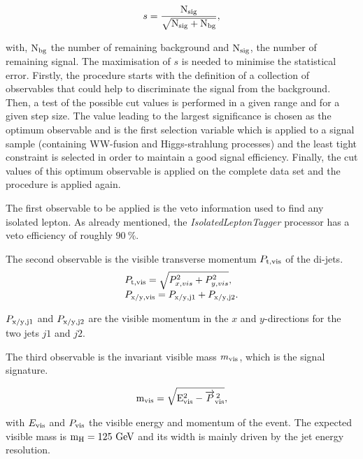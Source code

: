   \begin{equation}
    s = \frac{\rm{N_{sig}}}{\sqrt{\rm{N_{sig}}+ \rm{N_{bg}}}},
  \end{equation}

  with, $\rm{N_{bg}}$ the number of remaining background and $\rm{N_{sig}}$, the number of remaining signal.
  The maximisation of $s$ is needed to minimise the statistical error.
  Firstly, the procedure starts with the definition of a collection of observables that could help to discriminate the signal from the background.
  Then, a test of the possible cut values is performed in a given range and for a given step size.
  The value leading to the largest significance is chosen as the optimum observable and is the first selection variable which is applied to a signal sample (containing WW-fusion and Higgs-strahlung processes) and the least tight constraint is selected in order to maintain a good signal efficiency.
  Finally, the cut values of this optimum observable is applied on the complete data set and the procedure is applied again.

  The first observable to be applied is the veto information used to find any isolated lepton.
  As already mentioned, the \textit{IsolatedLeptonTagger} processor has a veto efficiency of roughly $90~\%$. 

  The second observable is the visible transverse momentum $P_{\rm{t,vis}}$ of the di-jets. 
  \begin{equation}
    \begin{array}{lcl}
      P_{\rm{t,vis}} = \sqrt{P^2_{x,vis} + P^2_{y,vis}}, \\
      P_{\rm{x/y,vis}} = P_{\rm{x/y,j1}} + P_{\rm{x/y,j2}}. 
    \end{array}
  \end{equation}
 
  $ P_{\rm{x/y,j1}}$ and $ P_{\rm{x/y,j2}}$ are the visible momentum in the $x$ and $y$-directions for the two jets $j1$ and $j2$.

  The third observable is the invariant visible mass $m_{\rm{vis}}$, which is the signal signature.

  \begin{equation}
   \rm{m_{vis}} = \sqrt{E^2_{\rm{vis}} - \overrightarrow{P}^{\,2}_{\rm{vis}}},
  \end{equation}

  with $E_{\rm{vis}}$ and $P_{\rm{vis}}$ the visible energy and momentum of the event.
  The expected visible mass is $\rm{m_H} = 125~\rm{GeV}$ and its width is mainly driven by the jet energy resolution.

